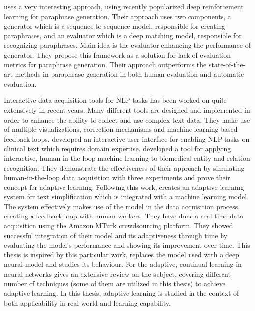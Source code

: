 \cite{Lietal} uses a very interesting approach, using recently popularized deep reinforcement learning for paraphrase generation. Their approach uses two components, a generator which is a sequence to sequence model, responsible for creating paraphrases, and an evaluator which is a deep matching model, responsible for recognizing paraphrases. Main idea is the evaluator enhancing the performance of generator. They propose this framework as a solution for lack of evaluation metrics for paraphrase generation. Their approach outperforms the state-of-the-art methods in paraphrase generation in both human evaluation and automatic evaluation.

Interactive data acquisition tools for NLP tasks has been worked on quite extensively in recent years. Many different tools are designed and implemented in order to enhance the ability to collect and use complex text data. They make use of multiple visualizations, correction mechanisms and machine learning based feedback loops. \cite{trivedi} developed an interactive user interface for enabling NLP tasks on clinical text which requires domain expertise. \cite{Yimam:2016aa} developed a tool for applying interactive, human-in-the-loop machine learning to biomedical entity and relation recognition. They demonstrate the effectiveness of their approach by simulating human-in-the-loop data acquisition with three experiments and prove their concept for adaptive learning. Following this work, \cite{par4sim} creates an adaptive learning system for text simplification which is integrated with a machine learning model. The system effectively makes use of the model in the data acquisition process, creating a feedback loop with human workers. They have done a real-time data acquisition using the Amazon MTurk crowdsourcing platform. They showed successful integration of their model and its adaptiveness through time by evaluating the model's performance and showing its improvement over time. This thesis is inspired by this particular work, replaces the model used with a deep neural model and studies its behaviour. For the adaptive, continual learning in neural networks \cite{parisi} gives an extensive review on the subject, covering different number of techniques (some of them are utilized in this thesis) to achieve adaptive learning. In this thesis, adaptive learning is studied in the context of both applicability in real world and learning capability.

